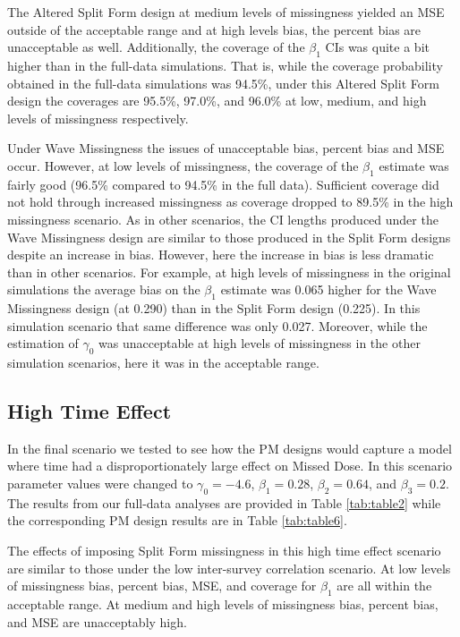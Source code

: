 \documentclass{svjour3}\usepackage[]{graphicx}\usepackage[]{color}
\begin{document}
The Altered Split Form design at medium levels of missingness yielded an MSE outside of the acceptable range and at high levels bias, the percent bias are unacceptable as well. Additionally, the coverage of the $\beta_1$ CIs was quite a bit higher than in the full-data simulations. That is, while the coverage probability obtained in the full-data simulations was 94.5\%, under this Altered Split Form design the coverages are 95.5\%, 97.0\%, and 96.0\% at low, medium, and high levels of missingness respectively. \par

Under Wave Missingness the issues of unacceptable bias, percent bias and MSE occur. However, at low levels of missingness, the coverage of the $\beta_1$ estimate was fairly good (96.5\% compared to 94.5\% in the full data). Sufficient coverage did not hold through increased missingness as coverage dropped to 89.5\% in the high missingness scenario. As in other scenarios, the CI lengths produced under the Wave Missingness design are similar to those produced in the Split Form designs despite an increase in bias. However, here the increase in bias is less dramatic than in other scenarios. For example, at high levels of missingness in the original simulations the average bias on the $\beta_1$ estimate was 0.065 higher for the Wave Missingness design (at 0.290) than in the Split Form design (0.225). In this simulation scenario that same difference was only 0.027. Moreover, while the estimation of $\gamma_0$ was unacceptable at high levels of missingness in the other simulation scenarios, here it was in the acceptable range.\par


\subsection{High Time Effect}
\label{sec:3.4}
In the final scenario we tested to see how the PM designs would capture a model where time had a disproportionately large effect on Missed Dose. In this scenario parameter values were changed to $\gamma_0 = -4.6$, $\beta_1 = 0.28$, $\beta_2 = 0.64$, and $\beta_3 = 0.2$. The results from our full-data analyses are provided in Table \ref{tab:table2} while the corresponding PM design results are in Table \ref{tab:table6}. \par

The effects of imposing Split Form missingness in this high time effect scenario are similar to those under the low inter-survey correlation scenario. At low levels of missingness bias, percent bias, MSE, and coverage for $\beta_1$ are all within the acceptable range. At medium and high levels of missingness bias, percent bias, and MSE are unacceptably high. \par 
\end{document}
